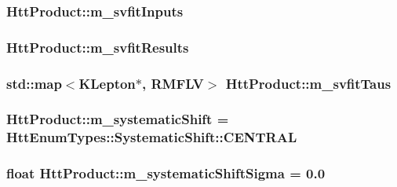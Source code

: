 \label{classHttProduct_a417c202e5be95c4971c52d7f51e92fd5}
\hypertarget{classHttProduct_a40ff729dcc44f180cb51b6532f5cbcc3}{
\subsubsection[{m\_\-svfitInputs}]{ {\bf HttProduct::m\_\-svfitInputs}}}
\label{classHttProduct_a40ff729dcc44f180cb51b6532f5cbcc3}
\hypertarget{classHttProduct_ae13b0856479d03387c5319192f4c7b77}{
\subsubsection[{m\_\-svfitResults}]{ {\bf HttProduct::m\_\-svfitResults}}}
\label{classHttProduct_ae13b0856479d03387c5319192f4c7b77}
\hypertarget{classHttProduct_afb683c52b390000148389a34a3b66a17}{
\subsubsection[{m\_\-svfitTaus}]{\setlength{\rightskip}{0pt plus 5cm}std::map$<$KLepton$\ast$, RMFLV$>$ {\bf HttProduct::m\_\-svfitTaus}}}
\label{classHttProduct_afb683c52b390000148389a34a3b66a17}
\hypertarget{classHttProduct_ad96ec3ff0504af461f0e71ed57853ef7}{
\subsubsection[{m\_\-systematicShift}]{ {\bf HttProduct::m\_\-systematicShift} = HttEnumTypes::SystematicShift::CENTRAL}}
\label{classHttProduct_ad96ec3ff0504af461f0e71ed57853ef7}
\hypertarget{classHttProduct_a5d765e15fd61df93b581ac259fffa8bc}{
\subsubsection[{m\_\-systematicShiftSigma}]{\setlength{\rightskip}{0pt plus 5cm}float {\bf HttProduct::m\_\-systematicShiftSigma} = 0.0}}
